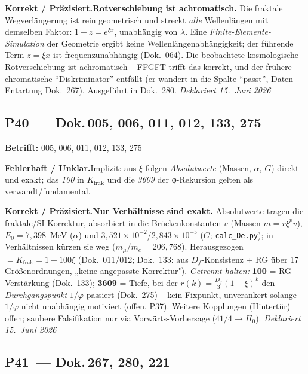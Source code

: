 \smallskip\noindent\textbf{Korrekt / Präzisiert.}\quad \textbf{Rotverschiebung ist achromatisch.} Die fraktale Wegverlängerung ist rein geometrisch und streckt \emph{alle} Wellenlängen mit demselben Faktor: $1+z=e^{\xi x}$, unabhängig von $\lambda$. Eine \emph{Finite-Elemente-Simulation} der Geometrie ergibt keine Wellenlängenabhängigkeit; der führende Term $z=\xi x$ ist frequenzunabhängig (Dok.~064). Die beobachtete kosmologische Rotverschiebung ist achromatisch -- FFGFT trifft das korrekt, und der frühere chromatische \enquote{Diskriminator} entfällt (er wandert in die Spalte \enquote{passt}, Daten-Entartung Dok.~267). Ausgeführt in Dok.~280. \emph{Deklariert 15.~Juni 2026}


\medskip


\subsection*{P40~--- Dok.\,005, 006, 011, 012, 133, 275}

\noindent\textbf{Betrifft:} 005, 006, 011, 012, 133, 275


\smallskip\noindent\textbf{Fehlerhaft / Unklar.}\quad Implizit: aus $\xi$ folgen \emph{Absolutwerte} (Massen, $\alpha$, $G$) direkt und exakt; das \emph{100} in $K_{\text{frak}}$ und die \emph{3609} der φ-Rekursion gelten als verwandt/fundamental.


\smallskip\noindent\textbf{Korrekt / Präzisiert.}\quad \textbf{Nur Verhältnisse sind exakt.} Absolutwerte tragen die fraktale/SI-Korrektur, absorbiert in die Brückenkonstanten $v$ (Massen $m=r\xi^p v$), $E_0=7{,}398$~MeV ($\alpha$) und $3{,}521\times10^{-2}$/$2{,}843\times10^{-5}$ ($G$; \texttt{calc\_De.py}); in Verhältnissen kürzen sie weg ($m_\mu/m_e=206{,}768$). Herausgezogen $=K_{\text{frak}}=1-100\xi$ (Dok.~011/012; Dok.~133: aus $D_f$-Konsistenz + RG über 17 Größenordnungen, „keine angepasste Korrektur"). \emph{Getrennt halten:} \textbf{100} = RG-Verstärkung (Dok.~133); \textbf{3609} = Tiefe, bei der $r(k)=\tfrac{D_f}{3}(1-\xi)^k$ den \emph{Durchgangspunkt} $1/\varphi$ passiert (Dok.~275) -- kein Fixpunkt, unverankert solange $1/\varphi$ nicht unabhängig motiviert (offen, P37). Weitere Kopplungen (Hintertür) offen; saubere Falsifikation nur via Vorwärts-Vorhersage ($41/4\to H_0$). \emph{Deklariert 15.~Juni 2026}


\medskip


\subsection*{P41~--- Dok.\,267, 280, 221}

